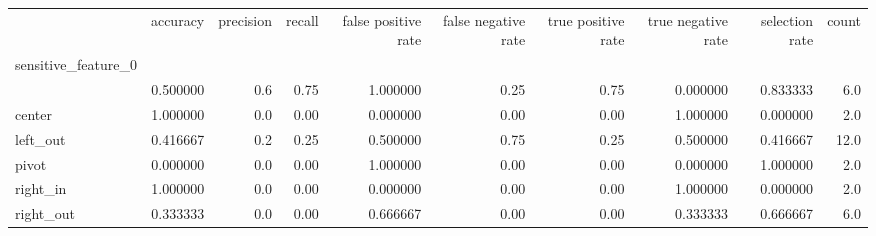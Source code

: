 \begin{tabular}{lrrrrrrrrr}
\toprule
{} &  accuracy &  precision &  recall &  false positive rate &  false negative rate &  true positive rate &  true negative rate &  selection rate &  count \\
sensitive\_feature\_0 &           &            &         &                      &                      &                     &                     &                 &        \\
\midrule
                    &  0.500000 &        0.6 &    0.75 &             1.000000 &                 0.25 &                0.75 &            0.000000 &        0.833333 &    6.0 \\
center              &  1.000000 &        0.0 &    0.00 &             0.000000 &                 0.00 &                0.00 &            1.000000 &        0.000000 &    2.0 \\
left\_out            &  0.416667 &        0.2 &    0.25 &             0.500000 &                 0.75 &                0.25 &            0.500000 &        0.416667 &   12.0 \\
pivot               &  0.000000 &        0.0 &    0.00 &             1.000000 &                 0.00 &                0.00 &            0.000000 &        1.000000 &    2.0 \\
right\_in            &  1.000000 &        0.0 &    0.00 &             0.000000 &                 0.00 &                0.00 &            1.000000 &        0.000000 &    2.0 \\
right\_out           &  0.333333 &        0.0 &    0.00 &             0.666667 &                 0.00 &                0.00 &            0.333333 &        0.666667 &    6.0 \\
\bottomrule
\end{tabular}
